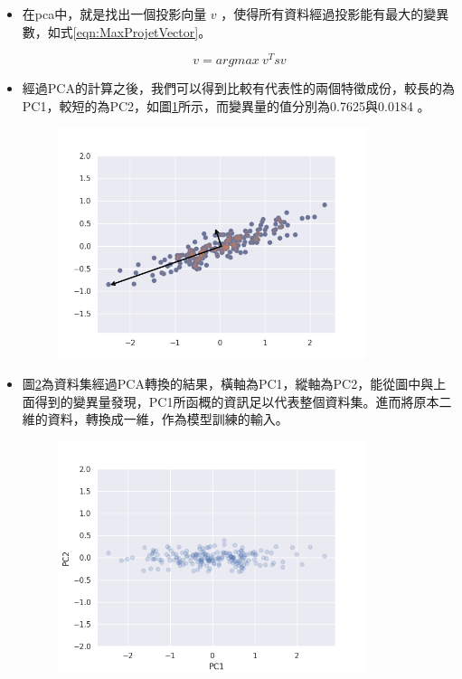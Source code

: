 \begin{itemize}
	\item
		在pca中，就是找出一個投影向量 \(v\) ，使得所有資料經過投影能有最大的變異數，如式\ref{eqn:MaxProjetVector}。

		\begin{equation}
			\label{eqn:MaxProjetVector}
			v = arg max\  v^Tsv			
		\end{equation}



		\newpage
	\item
		經過PCA的計算之後，我們可以得到比較有代表性的兩個特徵成份，較長的為PC1，較短的為PC2，如圖\ref{fig:Pc1AndPc2}所示，而變異量的值分別為0.7625與0.0184 。


	      \begin{figure}[H]
		      \centering
		      \includegraphics[width=9cm]{pic/pca_with_pca_axis.png}
		      \caption{}
		      \label{fig:Pc1AndPc2}
	      \end{figure}


	\item
	圖\ref{fig:PcaTransform}為資料集經過PCA轉換的結果，橫軸為PC1，縱軸為PC2，能從圖中與上面得到的變異量發現，PC1所函概的資訊足以代表整個資料集。進而將原本二維的資料，轉換成一維，作為模型訓練的輸⼊。


	      \begin{figure}[H]
		      \centering
		      \includegraphics[width=9cm]{pic/pca_transform.png}
		      \caption{}
		      \label{fig:PcaTransform}
	      \end{figure}

\end{itemize}


